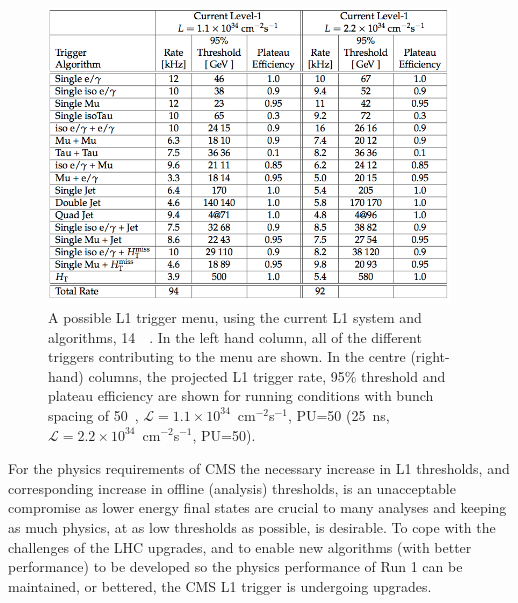 \begin{figure}[htbp]
  \begin{center}
  \includegraphics[width=0.95\textwidth]{Figures/l1jets/triggerThresholdCurrentL1Table.png}
  \caption{A possible  \ac{L1} trigger menu, using the current \ac{L1} system and algorithms,  14~\TeV~\cite{Tapper:1556311}. 
  In the left hand column, all of the different triggers contributing to the menu are shown. 
  In the centre (right-hand) columns, the projected L1 trigger rate, 95\% threshold and plateau efficiency are shown for  running conditions with bunch spacing of 50~\ns, $\mathcal{L}=1.1 \times 10^{34}$~cm$^{-2}$s$^{-1}$, PU=50 (25~ns, $\mathcal{L}=2.2 \times 10^{34}$~cm$^{-2}$s$^{-1}$, PU=50).
}
  \label{tab:L1TrigMenuCurrentSystem}
  \end{center}
\end{figure}


For the physics requirements of \ac{CMS} the necessary increase in \ac{L1} thresholds, and corresponding increase in offline (analysis) thresholds, is an unacceptable compromise as lower energy final states are crucial to many analyses and keeping as much physics, at as low thresholds as possible, is desirable.
To cope with the challenges of the \ac{LHC} upgrades, and to enable new algorithms (with better performance) to be developed so the physics performance of Run 1 can be maintained, or bettered, the \ac{CMS} \ac{L1} trigger is undergoing upgrades. 



